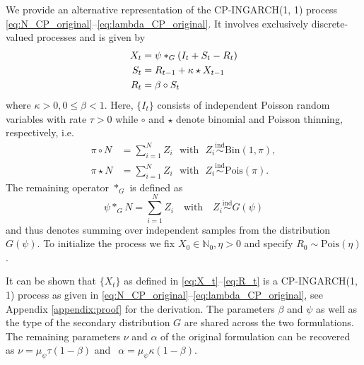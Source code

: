 \documentclass{article}
\begin{document}
We provide an alternative representation of the CP-INGARCH(1, 1) process \eqref{eq:N_CP_original}--\eqref{eq:lambda_CP_original}. It involves exclusively discrete-valued processes and is given by
\begin{align}
X_t & = \psi *_G (I_t + S_t - R_t)\label{eq:X_t}\\
S_t & = R_{t - 1} + \kappa \star X_{t - 1} \label{eq:juv_t}\\
R_t & = \beta \circ S_t \label{eq:R_t}
\end{align}
where $\kappa > 0, 0 \leq \beta < 1$. Here, $\{I_t\}$ consists of independent Poisson random variables with rate $\tau > 0$ while $\circ$ and $\star$ denote binomial and Poisson thinning, respectively, i.e.\
\begin{align*}
\pi \circ N & = \sum_{i = 1}^N Z_i \ \ \ \text{with} \ \ \ Z_i \stackrel{\text{ind}}{\sim} \text{Bin}(1, \pi), \\
\pi \star N & = \sum_{i = 1}^N Z_i \ \ \ \text{with} \ \ \ Z_i \stackrel{\text{ind}}{\sim} \text{Pois}(\pi).
\end{align*}
The remaining operator $*_G$ is defined as
$$
\psi *_G N = \sum_{i = 1}^N Z_i \ \ \ \text{ with } \ \ \ Z_i \stackrel{\text{ind}}{\sim} G(\psi)
$$
and thus denotes summing over independent samples from the distribution $G(\psi)$. To initialize the process we fix $X_0 \in \mathbb{N}_0, \eta > 0$ and specify $R_0 \sim \text{Pois}\left(\eta \right)$.

It can be shown that $\{X_t\}$ as defined in \eqref{eq:X_t}--\eqref{eq:R_t} is a CP-INGARCH(1, 1) process as given in \eqref{eq:N_CP_original}--\eqref{eq:lambda_CP_original}, see Appendix \ref{appendix:proof} for the derivation. The parameters $\beta$ and $\psi$ as well as the type of the secondary distribution $G$ are shared across the two formulations. The remaining parameters $\nu$ and $\alpha$ of the original formulation can be recovered as
$
\nu = \mu_\psi \tau(1 - \beta)$ and $ \ \
\alpha = \mu_\psi \kappa(1 - \beta).
$
\end{document}
